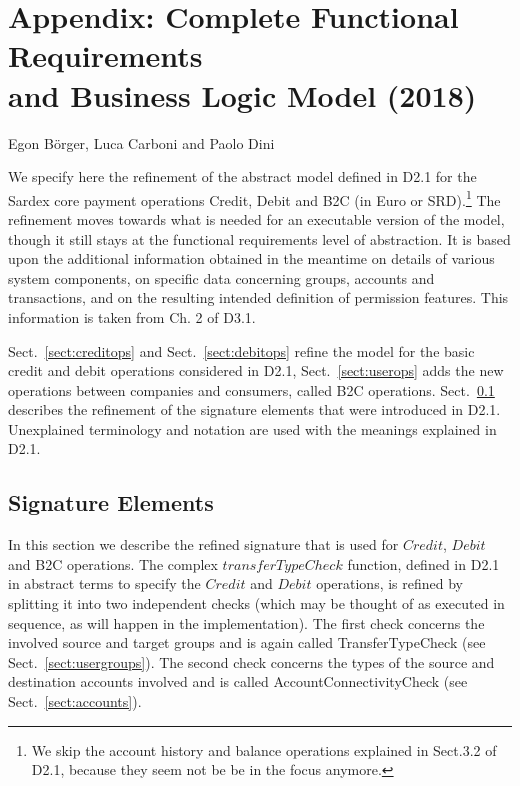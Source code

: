 \chapter*{Appendix: Complete Functional Requirements\\ and Business Logic Model (2018)}
\label{appendix}

\vspace{-1cm}
\begin{center}
Egon B\"orger, Luca Carboni and Paolo Dini
\end{center}

We specify here the refinement of the abstract model defined in D2.1 for the Sardex core payment operations Credit, Debit and B2C (in Euro or SRD).\footnote{We skip the account history and balance operations explained in Sect.3.2 of D2.1, because they seem not be be in the focus anymore.} The 
refinement moves towards what is needed for an executable version of the 
model, though it still stays at the functional requirements level of 
abstraction. It is based upon the additional information obtained in the 
meantime on details of various system components, on specific data concerning groups, accounts and transactions, and on the resulting intended definition of permission features. This information is taken from Ch. 2 of D3.1.

Sect.~\ref{sect:creditops} and Sect.~\ref{sect:debitops} refine the model for the basic credit and debit operations considered in D2.1,  Sect.~\ref{sect:userops} adds the new operations between companies and consumers, called B2C operations. Sect.~\ref{sect:signature} describes the refinement of the signature elements that were introduced in D2.1. Unexplained terminology and notation are used with the meanings explained in D2.1.

\section{Signature Elements}
\label{sect:signature}

In this section we describe the refined signature that is used for $Credit$, $Debit$ and B2C operations. The complex $transferTypeCheck$ function, defined in D2.1 in abstract terms to specify the $Credit$ and $Debit$ operations, is refined by splitting it into two independent checks (which may be thought of as executed in sequence, as will happen in the implementation).  The first check concerns the involved source and target groups and is again called TransferTypeCheck (see Sect.~\ref{sect:usergroups}). The second check concerns the types of the source and destination accounts involved and is called AccountConnectivityCheck (see Sect.~\ref{sect:accounts}).

